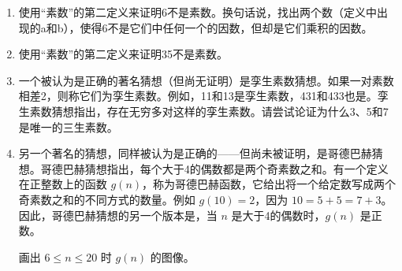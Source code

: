 \begin{enumerate}
  
  \item 
  
  使用“素数”的第二定义来证明6不是素数。换句话说，找出两个数（定义中出现的a和b），使得6不是它们中任何一个的因数，但却是它们乘积的因数。
  \wbvfill
  
  
  \item 
  
  使用“素数”的第二定义来证明35不是素数。
  \wbvfill
  
  
  \workbookpagebreak
  
  \item 
  
  一个被认为是正确的著名猜想（但尚无证明）是孪生素数猜想。如果一对素数相差2，则称它们为孪生素数。例如，11和13是孪生素数，431和433也是。孪生素数猜想指出，存在无穷多对这样的孪生素数。请尝试论证为什么3、5和7是唯一的三生素数。
  \wbvfill
  
  
  
  
  \item 
  
  另一个著名的猜想，同样被认为是正确的——但尚未被证明，是哥德巴赫猜想。哥德巴赫猜想指出，每个大于4的偶数都是两个奇素数之和。有一个定义在正整数上的函数 $g(n)$，称为哥德巴赫函数，它给出将一个给定数写成两个奇素数之和的不同方式的数量。例如 $g(10)=2$，因为 $10=5+5=7+3$。因此，哥德巴赫猜想的另一个版本是，当 $n$ 是大于4的偶数时，$g(n)$ 是正数。
  
  
  画出 $6 \leq n \leq 20$ 时 $g(n)$ 的图像。
  \wbvfill
  
  
  \end{enumerate}